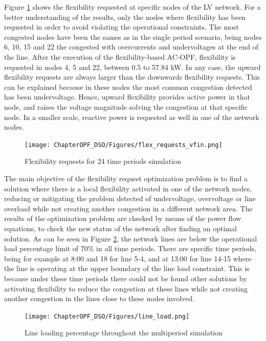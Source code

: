 Figure \ref{fig:flex_requests} shows the flexibility requested at specific nodes of the LV network. For a better understanding of the results, only the nodes where flexibility has been requested in order to avoid violating the operational constraints. The most congested nodes have been the sames as in the single period scenario, being nodes 6, 10, 15 and 22 the congested with overcurrents and undervoltages at the end of the line. After the execution of the flexibility-based AC-OPF, flexibility is requested in nodes 4, 5 and 22, between 0.5 to 57.84 kW. In any case, the upward flexibility requests are always larger than the downwards flexibility requests. This can be explained because in these nodes the most common congestion detected has been undervoltage. Hence, upward flexibility provides active power in that node, and raises the voltage magnitude solving the congestion at that specific node. In a smaller scale, reactive power is requested as well in one of the network nodes. 

\begin{figure}[htbp]
	\centering
	\texttt{[image: ChapterOPF\_DSO/Figures/flex\_requests\_vfin.png]}
	\caption{Flexibility requests for 24 time periods simulation}
	\label{fig:flex_requests}  
\end{figure}

The main objective of the flexibility request optimization problem is to find a solution where there is a local flexibility activated in one of the network nodes, reducing or mitigating the problem detected of undervoltage, overvoltage or line overload while not creating another congestion in a different network area. 
The results of the optimization problem are checked by means of the power flow equations, to check the new status of the network after finding an optimal solution. As can be seen in Figure \ref{fig:line_load}, the network lines are below the operational load percentage limit of 70\% in all time periods. There are specific time periods, being for example at 8:00 and 18 for line 5-4, and at 13:00 for line 14-15 where the line is operating at the upper boundary of the line load constraint. This is because under these time periods there could not be found other solutions by activating flexibility to reduce the congestion at these lines while not creating another congestion in the lines close to these nodes involved. 

\begin{figure}[htbp]
	\centering
	\texttt{[image: ChapterOPF\_DSO/Figures/line\_load.png]}
	\caption{Line loading percentage throughout the multiperiod simulation}
	\label{fig:line_load}  
\end{figure}

